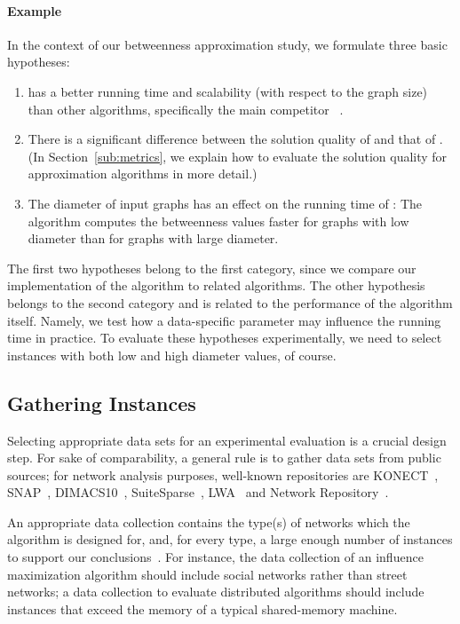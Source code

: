 \documentclass[algorithms,article,submit,moreauthors,pdftex]{Definitions/mdpi}
\newcommand{\removed}[1]{}
\begin{document}
\paragraph{\kad Example}
In the context of our betweenness approximation study,
  we formulate three basic hypotheses:
  \begin{enumerate}
  \item \kad has a better running time and scalability (with respect to the graph size)
  	than other algorithms, specifically the main competitor \rk~\cite{riondato2016fast}.
  \item There is a significant difference between the solution quality of \kad and that of \rk.
   (In Section~\ref{sub:metrics}, we explain how to evaluate the solution quality for approximation algorithms in more detail.)
  \item The diameter of input graphs has an effect on the running time of \kad:
   The \kad algorithm computes the betweenness values faster for graphs with low diameter than for graphs with large diameter.
  \end{enumerate}


  The first two hypotheses belong to the first category, since we compare
  our implementation of the \kad algorithm to \removed{a number of} related algorithms.
The other hypothesis belongs to the second category and is related to
the performance of the \kad algorithm itself. Namely,
we test how a data-specific parameter
may influence the running time in practice.
%
To evaluate these hypotheses experimentally, we need to select
instances with both low and high diameter values, of course.

\subsection{Gathering Instances}
\label{sub:instances}
%
Selecting appropriate data sets for an experimental evaluation is a crucial design step.
For sake of comparability, a general rule is to gather data sets from public sources;
for network analysis purposes, well-known repositories are KONECT~\cite{kunegis2013konect}, SNAP~\cite{snapnets}, DIMACS10~\cite{dimacs},
SuiteSparse~\cite{davis2011university}, LWA~\cite{BoVWFI} and
Network Repository~\cite{nr-sigkdd16}.

An appropriate data collection contains the type(s) of networks which the algorithm is designed for, and,
for every type, a large enough number of instances to support our conclusions~\cite{Johnson99}.
For instance, the data collection of an influence maximization algorithm should include social networks rather than
street networks; a data collection to evaluate distributed algorithms
should include instances that exceed the memory of a typical shared-memory machine.
\end{document}
